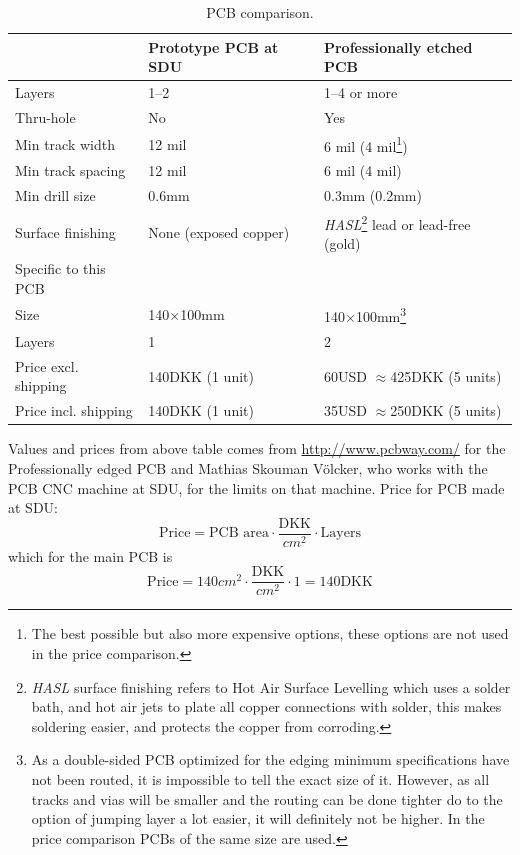 \documentclass[11pt]{article}
\begin{document}
\begin{table}[h]
  \centering
  \begin{tabular}{l|l|l}
    & Prototype PCB at SDU & Professionally etched PCB \\ \hline
    Layers & 1--2 & 1--4 or more \\
    Thru-hole & No & Yes \\
    Min track width & 12 mil & 6 mil (4 mil\footnote{The best possible but also more expensive options, these options are not used in the price comparison.})  \\
    Min track spacing  & 12 mil & 6 mil (4 mil)  \\ 
    Min drill size  & 0.6mm  & 0.3mm (0.2mm)  \\ 
    Surface finishing  & None (exposed copper) & \textit{HASL}\footnote{\textit{HASL} surface finishing refers to Hot Air Surface Levelling which uses a solder bath, and hot air jets to plate all copper connections with solder, this makes soldering easier, and protects the copper from corroding.} lead or lead-free (gold) \\ \hline
    Specific to this PCB & & \\ \hline
    Size & 140$\times$100mm  & 140$\times$100mm\footnote{As a double-sided PCB optimized for the edging minimum specifications have not been routed, it is impossible to tell the exact size of it. However, as all tracks and vias will be smaller and the routing can be done tighter do to the option of jumping layer a lot easier, it will definitely not be higher. In the price comparison PCBs of the same size are used.}  \\ 
    Layers  & 1 & 2  \\
    Price excl. shipping  & 140DKK (1 unit)  & 60USD $\approx$425DKK (5 units) \\ 
    Price incl. shipping  & 140DKK (1 unit)  & 35USD $\approx$250DKK (5 units) \\ 
  \end{tabular}
  \caption{PCB comparison.}
  \label{my-label}
\end{table}
Values and prices from above table comes from \url{http://www.pcbway.com/} for the Professionally edged PCB and Mathias Skouman V\"olcker, who works with the PCB CNC machine at SDU, for the limits on that machine. Price for PCB made at SDU:
$$\text{Price}=\text{PCB area} \cdot\frac{\text{DKK}}{cm^2}\cdot \text{Layers}$$
which for the main PCB is
$$\text{Price}=140cm^2 \cdot\frac{\text{DKK}}{cm^2}\cdot 1=140\text{DKK}$$
\end{document}
